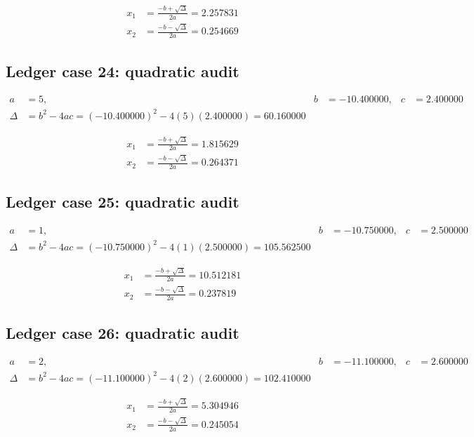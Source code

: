 \documentclass[11pt,a4paper]{article}
\begin{document}
\begin{align}
x_1 &= \frac{-b+\sqrt{\Delta}}{2a} = 2.257831 \\
x_2 &= \frac{-b-\sqrt{\Delta}}{2a} = 0.254669
\end{align}

\subsection{Ledger case 24: quadratic audit}
\begin{align}
a &= 5, & b &= -10.400000, & c &= 2.400000 \\
\Delta &= b^2-4ac = (-10.400000)^2 - 4(5)(2.400000) = 60.160000
\end{align}

\begin{align}
x_1 &= \frac{-b+\sqrt{\Delta}}{2a} = 1.815629 \\
x_2 &= \frac{-b-\sqrt{\Delta}}{2a} = 0.264371
\end{align}

\newpage

\subsection{Ledger case 25: quadratic audit}
\begin{align}
a &= 1, & b &= -10.750000, & c &= 2.500000 \\
\Delta &= b^2-4ac = (-10.750000)^2 - 4(1)(2.500000) = 105.562500
\end{align}

\begin{align}
x_1 &= \frac{-b+\sqrt{\Delta}}{2a} = 10.512181 \\
x_2 &= \frac{-b-\sqrt{\Delta}}{2a} = 0.237819
\end{align}

\subsection{Ledger case 26: quadratic audit}
\begin{align}
a &= 2, & b &= -11.100000, & c &= 2.600000 \\
\Delta &= b^2-4ac = (-11.100000)^2 - 4(2)(2.600000) = 102.410000
\end{align}

\begin{align}
x_1 &= \frac{-b+\sqrt{\Delta}}{2a} = 5.304946 \\
x_2 &= \frac{-b-\sqrt{\Delta}}{2a} = 0.245054
\end{align}
\end{document}

